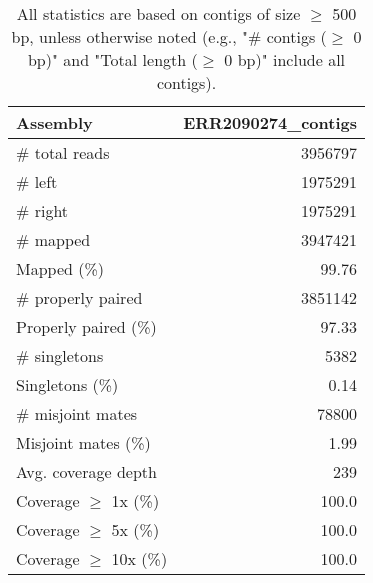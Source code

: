 \documentclass[12pt,a4paper]{article}
\begin{document}
\begin{table}[ht]
\begin{center}
\caption{All statistics are based on contigs of size $\geq$ 500 bp, unless otherwise noted (e.g., "\# contigs ($\geq$ 0 bp)" and "Total length ($\geq$ 0 bp)" include all contigs).}
\begin{tabular}{|l*{1}{|r}|}
\hline
Assembly & ERR2090274\_contigs \\ \hline
\# total reads & 3956797 \\ \hline
\# left & 1975291 \\ \hline
\# right & 1975291 \\ \hline
\# mapped & 3947421 \\ \hline
Mapped (\%) & 99.76 \\ \hline
\# properly paired & 3851142 \\ \hline
Properly paired (\%) & 97.33 \\ \hline
\# singletons & 5382 \\ \hline
Singletons (\%) & 0.14 \\ \hline
\# misjoint mates & 78800 \\ \hline
Misjoint mates (\%) & 1.99 \\ \hline
Avg. coverage depth & 239 \\ \hline
Coverage $\geq$ 1x (\%) & 100.0 \\ \hline
Coverage $\geq$ 5x (\%) & 100.0 \\ \hline
Coverage $\geq$ 10x (\%) & 100.0 \\ \hline
\end{tabular}
\end{center}
\end{table}
\end{document}
